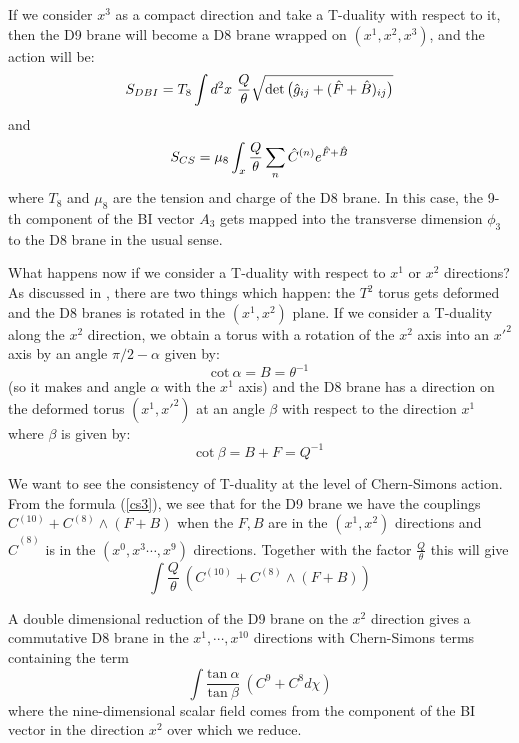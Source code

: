 \documentclass[a4paper,12pt]{article}
\begin{document}
If we consider $x^3$ as a compact direction and take a T-duality with respect
to it, then the D9 brane will become a D8 brane wrapped on  $(x^1, x^2, x^3)$,
and the action will be:
\begin{equation}
\label{dbi3}
S_{DBI} =  T_8 \int d^{2} x~ {Q \over \theta} 
\sqrt{\det\big(\hat{g}_{ij} + (\hat{F} + \hat{B})_{ij}\big)}
\end{equation}
and 
\begin{equation}
\label{cs3}
S_{CS} = \mu_8 \int_x {Q \over \theta}
\sum_n \hat{C}^{(n)} e^{\hat{F} + \hat{B}}
\end{equation}
where $T_8$ and $\mu_8$ are the tension and charge of the D8 brane.
In this case, the 9-th component of the BI vector $A_{3}$ gets mapped 
into the 
transverse dimension $\phi_{3}$ to the D8 brane in the usual sense.

What happens now if we consider a T-duality with respect to $x^1$ or $x^2$
directions? As discussed in 
\cite{chen,ima,blu1,blu2,blu3}, there are two things
which happen: the $T^2$ torus gets deformed and the D8 branes is rotated in
the  $(x^1, x^2)$ plane. If we consider a T-duality along the 
$x^2$ direction, we obtain a torus with a rotation of the $x^2$ axis
into an $x'^2$ axis by an angle $\pi/2 - \alpha$ given by:
\begin{equation}
\label{angles1}
\mbox{cot}~\alpha = B = \theta^{-1}
\end{equation}
(so it makes and angle $\alpha$ with the $x^1$ axis) 
and the D8 brane has a direction on the deformed torus $(x^1, x'^2)$ 
at an angle $\beta$ with respect to the direction $x^1$ where
$\beta$ is given by:
\begin{equation}
\label{angles2}
\mbox{cot}~\beta = B + F = Q^{-1}
\end{equation} 

We want to see the consistency of T-duality at the level 
of Chern-Simons action.
From the formula (\ref{cs3}), we see that for the D9 brane
 we have the couplings
$C^{(10)} + C^{(8)} \wedge (F + B)$ when the $F, B$ are 
in the $(x^1, x^2)$ directions and
$\hat C^{(8)}$ is in the $(x^0,x^3\cdots,x^9)$ directions. 
Together with the factor $\frac{Q}{\theta}$ this will give
\begin{equation}
\label{d9}
 \int \frac{Q}{\theta}~(C^{(10)} + C^{(8)} \wedge (F + B)) 
\end{equation}

A double dimensional reduction of the D9 brane on the $x^2$ direction gives a 
commutative D8 brane in the $x^1,\cdots,x^{10}$ directions with 
Chern-Simons terms containing the term
\begin{equation}
\label{dr}
\int  \frac{\mbox{tan}~\alpha}{\mbox{tan}~\beta}~(C^{9} + C^{8} d \chi)  
\end{equation}
where the nine-dimensional scalar field comes from
the component of the BI vector in the direction $x^2$ over which we reduce.
\end{document}
